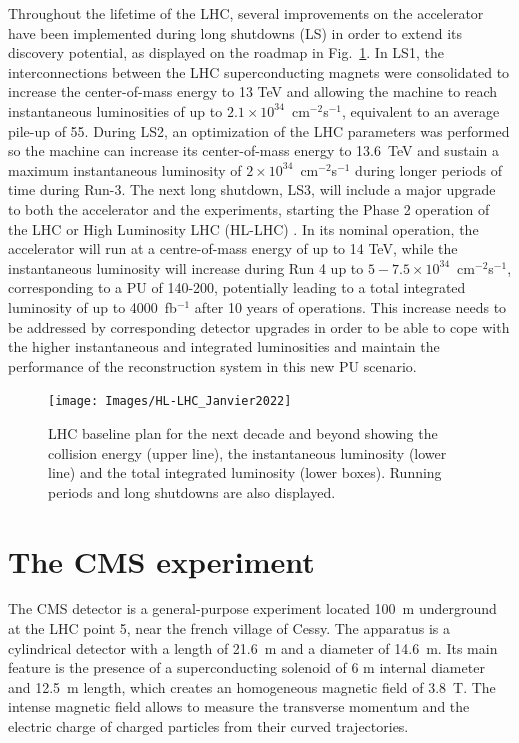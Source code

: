 \documentclass[../main.tex]{subfiles}
\begin{document}
Throughout the lifetime of the LHC, several improvements on the accelerator have been implemented during long shutdowns (LS) in order to extend its discovery potential, as displayed on the roadmap in Fig.~\ref{intro:exp:lhc_roadmap}. In LS1, the interconnections between the LHC superconducting magnets were consolidated to increase the center-of-mass energy to 13 TeV and allowing the machine to reach instantaneous luminosities of up to $2.1\times10^{34}$~cm${}^{-2}$s${}^{-1}$, equivalent to an average pile-up of 55. During LS2, an optimization of the LHC parameters was performed so the machine can increase its center-of-mass energy to 13.6~TeV and sustain a maximum instantaneous luminosity of $2\times10^{34}$~cm${}^{-2}$s${}^{-1}$ during longer periods of time during Run-3. The next long shutdown, LS3, will include a major upgrade to both the accelerator and the experiments, starting the Phase 2 operation of the LHC or High Luminosity LHC (HL-LHC) \cite{intro:exp:hllhc}. In its nominal operation, the accelerator will run at a centre-of-mass energy of up to 14 TeV, while the instantaneous luminosity will increase during Run 4 up to $5-7.5\times10^{34}$~cm${}^{-2}$s${}^{-1}$, corresponding to a PU of 140-200, potentially leading to a total integrated luminosity of up to 4000~fb${}^{-1}$ after 10 years of operations. This increase needs to be addressed by corresponding detector upgrades in order to be able to cope with the higher instantaneous and integrated luminosities and maintain the performance of the reconstruction system in this new PU scenario.

\begin{figure}[h!]
\begin{center}
\texttt{[image: Images/HL-LHC\_Janvier2022]}
\end{center}
\caption{LHC baseline plan for the next decade and beyond showing the collision energy (upper line), the instantaneous luminosity (lower line) and the total integrated luminosity (lower boxes). Running periods and long shutdowns are also displayed.}
\label{intro:exp:lhc_roadmap}
\end{figure}



\section{The CMS experiment}

The CMS detector \cite{intro:exp:cms} is a general-purpose experiment located 100~m underground at the LHC point 5, near the french village of Cessy. The apparatus is a cylindrical detector with a length of 21.6~m and a diameter of 14.6~m. Its main feature is the presence of a superconducting solenoid of 6 m internal diameter and 12.5~m length, which creates an homogeneous magnetic field of 3.8~T. The intense magnetic field allows to measure the transverse momentum and the electric charge of charged particles from their curved trajectories.
\end{document}

